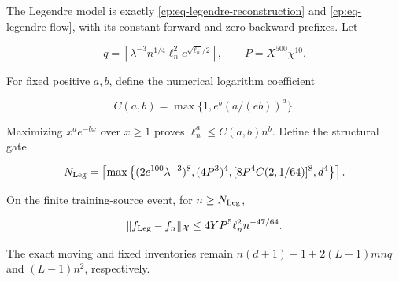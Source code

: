 The Legendre model is exactly \eqref{cp:eq-legendre-reconstruction} and
\eqref{cp:eq-legendre-flow}, with its constant forward and zero backward
prefixes. Let

\begin{equation}
q=\left\lceil\lambda^{-3}n^{1/4}\ell_n^2e^{\sqrt{\ell_n}/2}\right\rceil,
\qquad P=X^{500}\chi^{10}.
\label{cp:poly:eq:legendre-order}
\end{equation}

For fixed positive $a,b$, define the numerical logarithm coefficient

\[
C(a,b)=\max\{1,e^b(a/(eb))^a\}.
\]

Maximizing $x^ae^{-bx}$ over $x\ge1$ proves
$\ell_n^a\le C(a,b)n^b$. Define the structural gate

\begin{equation}
N_{\rm Leg}=\left\lceil\max\left\{
(2e^{100}\lambda^{-3})^8, (4P^3)^4,
[8P^4C(2,1/64)]^8, d^4
\right\}\right\rceil.
\label{cp:poly:eq:legendre-gate}
\end{equation}

\begin{proposition}
\label{cp:poly:legendre}

On the finite training-source event, for $n\ge N_{\rm Leg}$,

\begin{equation}
\|f_{\rm Leg}-f_n\|_{\mathcal X}
 \le4YP^5\ell_n^2n^{-47/64}.
\label{cp:poly:eq:legendre-error}
\end{equation}

The exact moving and fixed inventories remain
$n(d+1)+1+2(L-1)mnq$ and $(L-1)n^2$, respectively.

\end{proposition}

